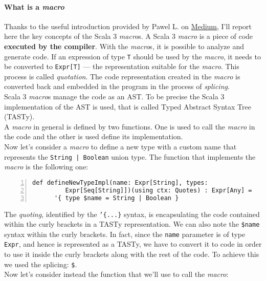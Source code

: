 \paragraph{What is a \textit{macro}}
Thanks to the useful introduction provided by Pawel L. on \href{https://medium.com/codex/scala-3-macros-without-pain-ce54d116880a}{Medium}, I'll report here the key concepts of the Scala 3 \textit{macro}s.
A Scala 3 \textit{macro} is a piece of code \textbf{executed by the compiler}.
With the \textit{macro}s, it is possible to analyze and generate code.
If an expression of type \texttt{T} should be used by the \textit{macro}, it needs to be converted to \texttt{Expr[T]} — the representation suitable for the \textit{macro}.
This process is called \textit{quotation}.
The code representation created in the \textit{macro} is converted back and embedded in the program in the process of \textit{splicing}.\\
Scala 3 \textit{macro}s manage the code as an AST. To be precise the Scala 3 implementation of the AST is used, that is called Typed Abstract Syntax Tree (TASTy).\\
A \textit{macro} in general is defined by two functions.
One is used to call the \textit{macro} in the code and the other is used define its implementation.\\
Now let's consider a \textit{macro} to define a new type with a custom name that represents the \texttt{String | Boolean} union type.
The function that implements the \textit{macro} is the following one:\\
\begin{minipage}{\linewidth}
  \begin{lstlisting}[numbers=left, numberstyle=\tiny, numbersep=-5pt, stepnumber=1]
    def defineNewTypeImpl(name: Expr[String], types:
         Expr[Seq[String]])(using ctx: Quotes) : Expr[Any] = 
      '{ type $name = String | Boolean }
  \end{lstlisting}
\end{minipage}
The \textit{quoting}, identified by the \texttt{'\{...\}} syntax, is encapsulating the code contained within the curly brackets in a TASTy representation.
We can also note the \texttt{\$name} syntax within the curly brackets.
In fact, since the \texttt{name} parameter is of type \texttt{Expr}, and hence is represented as a TASTy, we have to convert it to code in order to use it inside the curly brackets along with the rest of the code.
To achieve this we used the splicing: \texttt{\$}.\\
Now let's consider instead the function that we'll use to call the \textit{macro}:\\

